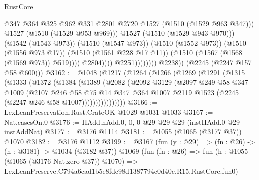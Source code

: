 \begin{lexlean}{RustCore}
\begin{coremodule}
                                            @347
                                            @364
                                            @325
                                            @962
                                            @331
                                            @2801
                                            @2720
                                            @1527
                                            (@1510 (@1529 @963 @347)))
                                          @1527
                                          (@1510 (@1529 @953 @969)))
                                        @1527
                                        (@1510 (@1529 @943 @970)))
                                      (@1542 (@1543 @973))
                                      (@1510 (@1547 @973))
                                      (@1510 (@1552 @973))
                                      (@1510 (@1556 @973 @17))
                                      (@1510 (@1561 @228 @17 @11))
                                      (@1510 (@1567 (@1568 (@1569 @973)) @519))))
                                  @2804))))
                          @2251))))))))
          @2238))
      (@2245 (@2247 @157 @58 @600)))
@3162 := @1048
    (@1217
      (@1264
        (@1266
          (@1269
            (@1291
              (@1315
                (@1333
                  (@1372
                    (@1384
                      (@1389
                        (@2082
                          (@2092
                            @3129
                            (@2097
                              @249
                              @58
                              @347
                              @1009
                              (@2107
                                @246
                                @58
                                @75
                                @14
                                @347
                                @364
                                @1007
                                @2119
                                @1523
                                (@2245 (@2247 @246 @58 @1007))))))))))))))))
@3166 := LexLeanPreservation.Rust.CrateOK @1029 @1031 @1033
@3167 := Nat.casesOn.{0}
@3176 := HAdd.hAdd.{0, 0, 0} @29 @29 @29 (instHAdd.{0} @29 instAddNat)
@3177 := @3176 @1114
@3181 := @1055 (@1065 (@3177 @37)) @1070
@3182 := @3176 @1112
@3199 := @3167
    (fun (y : @29) => (fn : @26) -> (h : @3181) -> @1034 (@3182 @37))
    @1069
    (fun (fn : @26) =>
    fun (h : @1055 (@1065 (@3176 Nat.zero @37)) @1070) =>
    LexLeanPreserve.C794a6cad1b5e8fdc98d1387794c0d40c.R15.RustCore.fun0)

\end{coremodule}
\end{lexlean}
